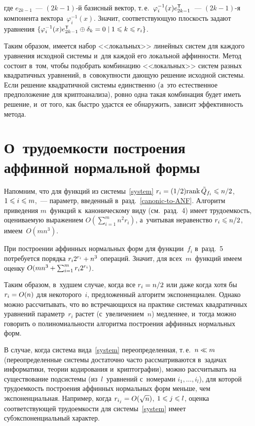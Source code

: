 \begin{multicols}{2}
\noindent
где $e_{2k-1}$~--- $(2k-1)$-й базисный вектор, т.\,е.\ $\varphi_i^{-1}(x)e_{2k-1}
^{\mathsf T}$~--- $(2k-1)$-я компонента вектора~$\varphi_i^{-1}(x)$.
Значит, соответствующую плоскость задают уравнения
 $\{ \varphi_i^{-1}(x)e_{2k-1}\Tsf \oplus \delta_k \hm= 0 
 \mid 1\hm\leqslant k\hm\leqslant r_i \}$.

\smallskip

Таким образом, имеется набор <<локальных>> линейных систем для каждого уравнения 
исходной системы и~для каждой его локальной аффинности.
Метод состоит в~том, чтобы подобрать комбинацию <<локальных>> систем разных 
квадратичных уравнений, в~совокупности дающую решение исходной системы. Если 
решение квадратичной системы единственно (а~это естественное предположение для 
криптоанализа), ровно одна такая комбинация будет иметь решение, и~от того, как 
быстро удастся ее обнаружить, зависит эффективность метода.

\vspace*{-4pt}

\section{О~трудоемкости построения аффинной нормальной формы}

\vspace*{-2pt}

Напомним, что для функций из системы~\eqref{system} $r_i\hm=({1}/{2})\rank 
\tilde{Q}_{f_i}\hm\leqslant {n}/{2}$, $1\hm\leqslant i\hm\leqslant m$,~--- 
параметр, введенный в~разд.~\ref{canonic-to-ANF}.
Алгоритм приведения $m$~функций к~каноническому виду (см.\ разд.~4) 
имеет трудоемкость, оцениваемую выражением $O(\sum\nolimits_{i=1}^m n^2r_i)$, 
а~учитывая 
неравенство $r_i\hm\leqslant {n}/{2}$, имеем~$O(mn^3)$.

При построении аффинных нормальных форм для функции~$f_i$ в~разд.~5 
потребуется порядка $r_i2^{r_i}\hm+ n^3$ операций. 
Значит, для всех~$m$~функций имеем оценку $O(mn^3\hm+\sum\nolimits_{i=1}^m r_i2^{r_i})$.

Таким образом, в~худшем случае, когда все $r_i\hm={n}/{2}$ или даже когда хотя 
бы $r_i\hm=O(n)$ для некоторого~$i$, предложенный алгоритм экспоненциален.
Однако можно рассчитывать, что во встречающихся на практике системах 
квадратичных уравнений параметр~$r_i$ растет (с~увеличением~$n$) медленнее, 
и~тогда можно говорить о полиномиальности алгоритма построения аффинных нормальных 
форм.

В случае, когда система вида~\eqref{system} переопределенная, т.\,е.\ $n\hm\ll m$ 
(переопределенные системы достаточно часто рассматриваются в~задачах 
информатики, теории кодирования и~криптографии), можно рассчитывать на 
существование подсистемы (из~$l$~уравнений с~номерами $i_1,\ldots,i_l$), для 
которой трудоемкость построения аффинных нормальных форм меньше, чем 
экспоненциальная. Например, когда $r_{i_j}\hm=O(\sqrt{n})$, $ 1\hm\leqslant j\hm\leqslant l$, 
оценка со\-от\-вет\-ст\-ву\-ющей трудоемкости для системы~\eqref{system} имеет 
субэкспоненциальный характер.


\end{multicols}
